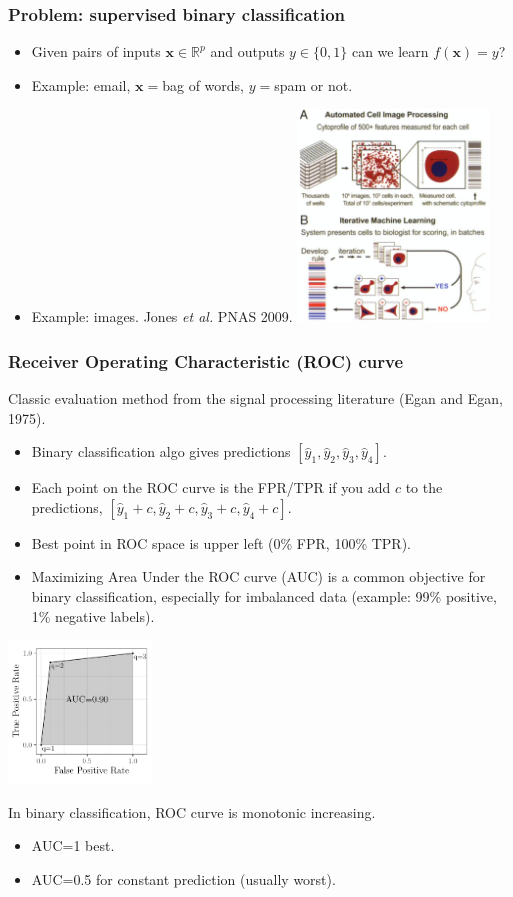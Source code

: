 \documentclass{beamer}
\begin{document}
\begin{frame}
  \frametitle{Problem: supervised binary classification}
  
  \begin{itemize}
  \item Given pairs of inputs $\mathbf x\in\mathbb R^p$ and outputs
    $y\in\{0,1\}$ can we learn $f(\mathbf x)= y$?
  \item Example: email, $\mathbf x =$bag of words, $y=$spam or not.
  \item Example: images. Jones {\it et al.} PNAS 2009. \includegraphics[width=2in]{cellprofiler} 
  \end{itemize} 

\end{frame}

\begin{frame}
  \frametitle{Receiver Operating Characteristic (ROC) curve}
Classic evaluation method from the signal processing literature (Egan and
    Egan, 1975). 
  \begin{itemize}
  \item Binary classification algo gives predictions
    $[\hat y_1,\hat y_2,\hat y_3,\hat y_4]$.
  \item Each point on the ROC curve is the FPR/TPR if you add $c$ to
    the predictions, $[\hat y_1+c,\hat y_2+c,\hat y_3+c,\hat y_4+c]$.
  \item Best point in ROC space is upper left (0\% FPR, 100\% TPR).
  \item Maximizing Area Under the ROC curve (AUC) is a common
    objective for binary classification, especially for imbalanced
    data (example: 99\% positive, 1\% negative labels).
  \end{itemize} 
  
  \parbox{1.5in}{
\includegraphics[width=1.5in]{figure-more-than-one-less-auc}
}
\parbox{2.5in}{
In binary classification, ROC curve is monotonic increasing.
  \begin{itemize}
  \item AUC=1 best.
  \item AUC=0.5 for constant prediction (usually worst).
  \end{itemize}
}

\end{frame}
\end{document}
